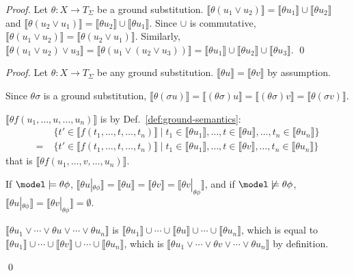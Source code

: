 \acdisj*
\begin{proof}
Let $\theta : X \to T_\Sigma$ be a  ground substitution.
$\llbracket \theta (u_1 \vee  u_2)\rrbracket  = \llbracket \theta u_1 \rrbracket \cup \llbracket \theta u_2 \rrbracket$
and 
$\llbracket\theta(u_2 \vee u_1)\rrbracket = \llbracket \theta u_2 \rrbracket \cup \llbracket \theta u_1 \rrbracket$.
Since $\cup$ is commutative,  $\llbracket \theta (u_1 \vee  u_2)\rrbracket = \llbracket\theta(u_2 \vee u_1)\rrbracket$.
%
Similarly,
$\llbracket \theta (u_1 \vee  u_2) \vee u_3 \rrbracket =  \llbracket\theta(u_1 \vee (u_2 \vee u_3))\rrbracket = \llbracket \theta u_1 \rrbracket \cup \llbracket \theta u_2 \rrbracket \cup \llbracket \theta u_3 \rrbracket$.
\qed
\end{proof}

\congruence*
\begin{proof}
%
Let $\theta : X \to T_\Sigma$ be any ground substitution. 
$\llbracket \theta u \rrbracket = \llbracket \theta v\rrbracket$ by assumption.
\begin{inparaenum}[(1)]
	\item Since $\theta \sigma$ is a ground substitution, 
		 $\llbracket \theta (\sigma u) \rrbracket = \llbracket (\theta \sigma) u \rrbracket = \llbracket (\theta \sigma) v \rrbracket = \llbracket \theta (\sigma v) \rrbracket$.
	\item 
	$\llbracket  \theta f( u_1, \ldots, u, \ldots, u_n) \rrbracket$ is by Def.~\ref{def:ground-semantics}:
	\begin{align*}
	& \{t' \in \llbracket f(t_1,\ldots, t, \ldots, t_n)\rrbracket \mid  t_1 \in \llbracket \theta u_1\rrbracket, \ldots, t \in \llbracket \theta u\rrbracket, \ldots, t_n \in \llbracket \theta u_n\rrbracket  \}
	\\
	=\;& \{t' \in \llbracket f(t_1,\ldots, t, \ldots,t_n)\rrbracket \mid  t_1 \in \llbracket \theta u_1\rrbracket, \ldots, t \in \llbracket \theta v\rrbracket, \ldots, t_n \in \llbracket \theta u_n\rrbracket  \}
	\end{align*}
	that is $\llbracket  \theta f( u_1, \ldots, v, \ldots, u_n) \rrbracket$. 
	\item If $\model \models \theta\phi$, $\llbracket \theta u |_{\theta\phi}\rrbracket = \llbracket \theta u \rrbracket = \llbracket \theta v \rrbracket = \llbracket \theta v |_{\theta\phi}\rrbracket$,
	and if $\model \not\models \theta\phi$, $\llbracket \theta u |_{\theta\phi}\rrbracket  = \llbracket \theta v |_{\theta\phi}\rrbracket = \emptyset$.
	\item $\llbracket \theta u_1 \vee \cdots \vee \theta u \vee \cdots \vee \theta u_n\rrbracket$ is
	$\llbracket \theta u_1\rrbracket \cup \cdots \cup \llbracket \theta u \rrbracket \cup \cdots \cup \llbracket \theta u_n\rrbracket$,
	which is equal to
	$\llbracket \theta u_1\rrbracket \cup \cdots \cup \llbracket \theta v \rrbracket \cup \cdots \cup \llbracket \theta u_n\rrbracket $,
	which is $\llbracket \theta u_1 \vee \cdots \vee \theta v \vee \cdots \vee \theta u_n\rrbracket$ by definition.
\end{inparaenum}
\qed
\end{proof}


